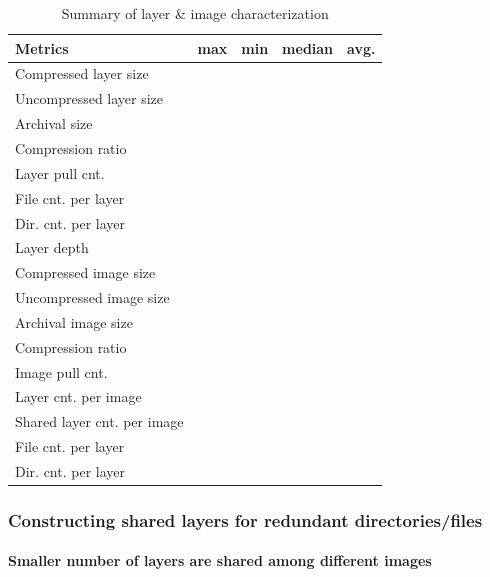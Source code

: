 \begin{table} 
	\centering 
	\scriptsize  
	\caption{Summary of layer \& image characterization} \label{tbl:redundant_ratio} 
	\begin{tabular}{|l|l|l|l|l|}%
		\hline 
		Metrics & max & min & median & avg.\\
		\hline
		Compressed layer size &   &   &   &  \\
		\hline
		Uncompressed layer size &   &   &    &  \\
		\hline
		Archival size &  &  & & \\
		\hline
		Compression ratio &   &   &    &  \\
		\hline
		Layer pull cnt. &  &  & & \\
		\hline
		File cnt. per layer &  &  & & \\
		\hline
		Dir. cnt. per layer &  &  & & \\
		\hline
		Layer depth &  &  & & \\
		\hline
		\hline
		Compressed image size &  &  & & \\
		\hline
		Uncompressed image size & &  &  & \\
		\hline
		Archival image size & &  &  & \\
		\hline
		Compression ratio &   &   &    &  \\
		\hline
		Image pull cnt.  &  &  & & \\
		\hline
		Layer cnt. per image  &  &  & & \\
		\hline
		Shared layer cnt. per image  &  &  & & \\
		\hline
		File cnt. per layer &  &  & & \\
		\hline
		Dir. cnt. per layer &  &  & & \\
		\hline	
	\end{tabular} 
\end{table} 

\subsubsection{Constructing shared layers for redundant directories/files}

\paragraph{Smaller number of layers are shared among different images}


